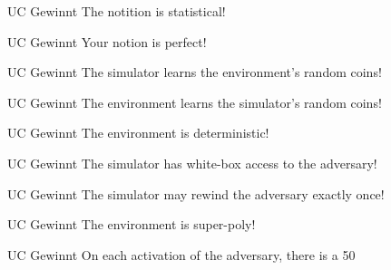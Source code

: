 \documentclass[avery5371,frame,grid]{flashcards}
\begin{document}
\begin{flashcard}{UC Gewinnt}
	The notition is statistical!
\end{flashcard}

\begin{flashcard}{UC Gewinnt}
Your notion is perfect!
\end{flashcard}
\begin{flashcard}{UC Gewinnt}
The simulator learns the environment's random coins!
\end{flashcard}
\begin{flashcard}{UC Gewinnt}
The environment learns the simulator's random coins!
\end{flashcard}
\begin{flashcard}{UC Gewinnt}
The environment is deterministic!
\end{flashcard}
\begin{flashcard}{UC Gewinnt}
The simulator has white-box access to the adversary!
\end{flashcard}
\begin{flashcard}{UC Gewinnt}
The simulator may rewind the adversary exactly once!
\end{flashcard}
\begin{flashcard}{UC Gewinnt}
The environment is super-poly!
\end{flashcard}
\begin{flashcard}{UC Gewinnt}
On each activation of the adversary, there is a 50%
\end{flashcard}
\end{document}
